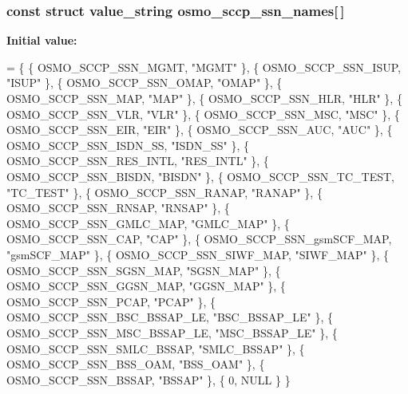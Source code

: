 \subsubsection[{osmo\+\_\+sccp\+\_\+ssn\+\_\+names}]{\setlength{\rightskip}{0pt plus 5cm}const struct value\+\_\+string osmo\+\_\+sccp\+\_\+ssn\+\_\+names[$\,$]}\label{sccp__sap_8c_a5fed5e157ab1a93095318b73beb22813}
{\bfseries Initial value\+:}
\begin{DoxyCode}
= \{
        \{ OSMO_SCCP_SSN_MGMT,           \textcolor{stringliteral}{"MGMT"} \},
        \{ OSMO_SCCP_SSN_ISUP,           \textcolor{stringliteral}{"ISUP"} \},
        \{ OSMO_SCCP_SSN_OMAP,           \textcolor{stringliteral}{"OMAP"} \},
        \{ OSMO_SCCP_SSN_MAP,            \textcolor{stringliteral}{"MAP"} \},
        \{ OSMO_SCCP_SSN_HLR,            \textcolor{stringliteral}{"HLR"} \},
        \{ OSMO_SCCP_SSN_VLR,            \textcolor{stringliteral}{"VLR"} \},
        \{ OSMO_SCCP_SSN_MSC,            \textcolor{stringliteral}{"MSC"} \},
        \{ OSMO_SCCP_SSN_EIR,            \textcolor{stringliteral}{"EIR"} \},
        \{ OSMO_SCCP_SSN_AUC,            \textcolor{stringliteral}{"AUC"} \},
        \{ OSMO_SCCP_SSN_ISDN_SS,        \textcolor{stringliteral}{"ISDN\_SS"} \},
        \{ OSMO_SCCP_SSN_RES_INTL,       \textcolor{stringliteral}{"RES\_INTL"} \},
        \{ OSMO_SCCP_SSN_BISDN,          \textcolor{stringliteral}{"BISDN"} \},
        \{ OSMO_SCCP_SSN_TC_TEST,        \textcolor{stringliteral}{"TC\_TEST"} \},
        \{ OSMO_SCCP_SSN_RANAP,          \textcolor{stringliteral}{"RANAP"} \},
        \{ OSMO_SCCP_SSN_RNSAP,          \textcolor{stringliteral}{"RNSAP"} \},
        \{ OSMO_SCCP_SSN_GMLC_MAP,       \textcolor{stringliteral}{"GMLC\_MAP"} \},
        \{ OSMO_SCCP_SSN_CAP,            \textcolor{stringliteral}{"CAP"} \},
        \{ OSMO_SCCP_SSN_gsmSCF_MAP,     \textcolor{stringliteral}{"gsmSCF\_MAP"} \},
        \{ OSMO_SCCP_SSN_SIWF_MAP,       \textcolor{stringliteral}{"SIWF\_MAP"} \},
        \{ OSMO_SCCP_SSN_SGSN_MAP,       \textcolor{stringliteral}{"SGSN\_MAP"} \},
        \{ OSMO_SCCP_SSN_GGSN_MAP,       \textcolor{stringliteral}{"GGSN\_MAP"} \},
        \{ OSMO_SCCP_SSN_PCAP,           \textcolor{stringliteral}{"PCAP"} \},
        \{ OSMO_SCCP_SSN_BSC_BSSAP_LE,   \textcolor{stringliteral}{"BSC\_BSSAP\_LE"} \},
        \{ OSMO_SCCP_SSN_MSC_BSSAP_LE,   \textcolor{stringliteral}{"MSC\_BSSAP\_LE"} \},
        \{ OSMO_SCCP_SSN_SMLC_BSSAP,     \textcolor{stringliteral}{"SMLC\_BSSAP"} \},
        \{ OSMO_SCCP_SSN_BSS_OAM,        \textcolor{stringliteral}{"BSS\_OAM"} \},
        \{ OSMO_SCCP_SSN_BSSAP,          \textcolor{stringliteral}{"BSSAP"} \},
        \{ 0, NULL \}
\}
\end{DoxyCode}



